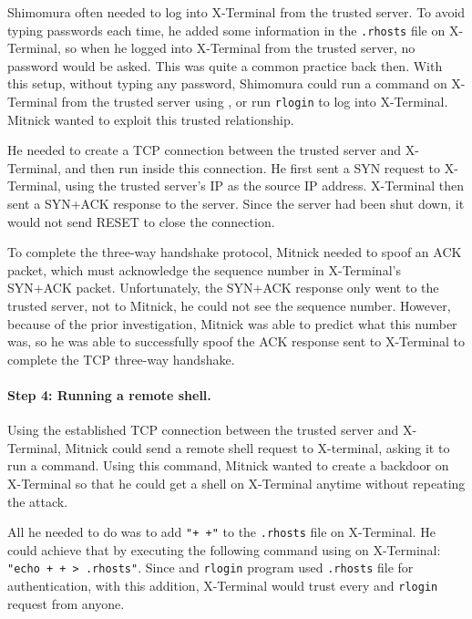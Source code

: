 Shimomura often needed to log into X-Terminal from the trusted server. To 
avoid typing passwords each time, he added some information
in the \texttt{.rhosts} file on X-Terminal, so when he logged into
X-Terminal from the trusted server, no password would be asked. This was quite a 
common practice back then. With this setup,
without typing any password, 
Shimomura could run a command on X-Terminal from the trusted server using 
\rsh, or run \texttt{rlogin} to log into X-Terminal. 
Mitnick wanted to exploit this trusted relationship.


He needed to create a TCP connection between the trusted server and
X-Terminal, and then run \rsh inside this connection.   
He first sent a SYN request to X-Terminal, using the trusted server's IP as the source IP address.
X-Terminal then sent a SYN+ACK response to the server. Since the server had been shut
down, it would not send RESET to close the connection. 

To complete the three-way handshake protocol, Mitnick needed to spoof
an ACK packet, which must acknowledge the sequence number in 
X-Terminal's SYN+ACK packet. Unfortunately, 
the SYN+ACK response only went to the trusted server, not to Mitnick,
he could not see the sequence number. However, 
because of the prior investigation, Mitnick was able to
predict what this number was, so he was able to 
successfully spoof the ACK response sent to X-Terminal to complete the TCP three-way
handshake. 


\paragraph{Step 4: Running a remote shell.} 
Using the established TCP connection between the trusted server and X-Terminal, Mitnick
could send a remote shell request to X-terminal, asking 
it to run a command. Using this command, 
Mitnick wanted to create a
backdoor on X-Terminal so that he could get a shell 
on X-Terminal anytime without repeating the attack. 

All he needed to do was to add  
\texttt{"+ +"} to the \texttt{.rhosts} file on X-Terminal.
He could achieve that
by executing the following command using \rsh on X-Terminal: 
{\tt "echo + + > .rhosts"}. 
Since \rsh and \texttt{rlogin} program used
\texttt{.rhosts} file for authentication, with this addition, 
X-Terminal would trust every
\rsh and \texttt{rlogin} request from anyone. 



